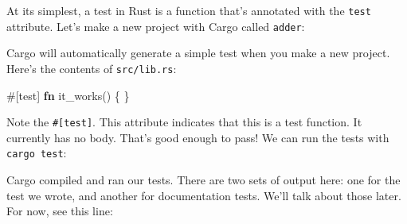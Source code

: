 \documentclass[a4paper,]{book}
\newenvironment{Shaded}{\begin{snugshade}}{\end{snugshade}}
\newcommand{\KeywordTok}[1]{\textcolor[rgb]{0.13,0.29,0.53}{\textbf{{#1}}}}
\newcommand{\OtherTok}[1]{\textcolor[rgb]{0.56,0.35,0.01}{{#1}}}
\newcommand{\NormalTok}[1]{{#1}}
\begin{document}
At its simplest, a test in Rust is a function that's annotated with the
\texttt{test} attribute. Let's make a new project with Cargo called
\texttt{adder}:

\begin{Shaded}
\end{Shaded}

Cargo will automatically generate a simple test when you make a new
project. Here's the contents of \texttt{src/lib.rs}:

\begin{Shaded}
\begin{Highlighting}[]
\OtherTok{#[}\NormalTok{test}\OtherTok{]}
\KeywordTok{fn} \NormalTok{it_works() \{}
\NormalTok{\}}
\end{Highlighting}
\end{Shaded}

Note the \texttt{\#{[}test{]}}. This attribute indicates that this is a
test function. It currently has no body. That's good enough to pass! We
can run the tests with \texttt{cargo\ test}:

\begin{Shaded}
\end{Shaded}

Cargo compiled and ran our tests. There are two sets of output here: one
for the test we wrote, and another for documentation tests. We'll talk
about those later. For now, see this line:
\end{document}
